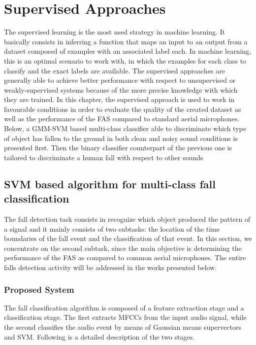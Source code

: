 \chapter{Supervised Approaches}
\label{ch:supervised_approaches}
The supervised learning is the most used strategy in machine learning. It basically consists in inferring a function that maps an input to an output from a dataset composed of examples with an associated label each. In machine learning, this is an optimal scenario to work with, in which the examples for each class to classify and the exact labels are available. %
The supervised approaches are generally able to achieve better performance with respect to unsupervised or weakly-supervised systems because of the more precise knowledge with which they are trained. In this chapter, the supervised approach is used to work in favourable conditions in order to evaluate the quality of the created dataset as well as the performance of the FAS compared to standard aerial microphones. Below, a GMM-SVM based multi-class classifier able to discriminate which type of object has fallen to the ground in both clean and noisy sound conditions is presented first. Then the binary classifier counterpart of the previous one is tailored to discriminate a human fall with respect to other sounds


\section{SVM based algorithm for multi-class fall classification}
\label{sec:algorithm_svm_multiclass}
The fall detection task consists in recognize which object produced the pattern of a signal and it mainly consists of two subtasks: the location of the time boundaries of the fall event and the classification of that event. In this section, we concentrate on the second subtask, since the main objective is determining the performance of the FAS as compared to common aerial microphones. The entire falls detection activity will be addressed in the works presented below.

\subsection{Proposed System}
The fall classification algorithm is composed of a feature extraction stage and a classification stage. The first extracts MFCCs from the input audio signal, while the second classifies the audio event by means of Gaussian means supervectors and SVM. Following is a detailed description of the two stages.

